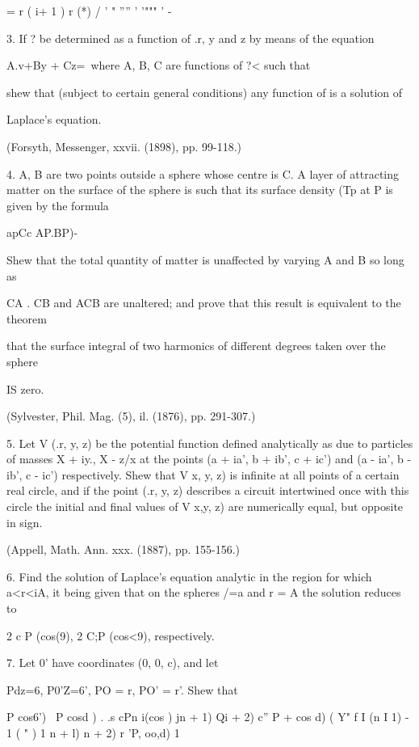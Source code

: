  = r ( i+ 1 ) r (*) / ' " '''' ' '""" ' - 

3. If ? be determined as a function of .r, y and z by means of the
equation

A.v+By + Cz=\, where A, B, C are functions of ?< such that

shew that (subject to certain general conditions) any function of is a
solution of

Laplace's equation.

(Forsyth, Messenger, xxvii. (1898), pp. 99-118.)

4. A, B are two points outside a sphere whose centre is C. A layer of
attracting matter on the surface of the sphere is such that its
surface density (Tp at P is given by the formula

apCc AP.BP)-\

Shew that the total quantity of matter is unaffected by varying A and
B so long as

CA . CB and ACB are unaltered; and prove that this result is
equivalent to the theorem

that the surface integral of two harmonics of different degrees taken
over the sphere

IS zero.

(Sylvester, Phil. Mag. (5), il. (1876), pp. 291-307.)

5. Let V (.r, y, z) be the potential function defined analytically as
due to particles of masses X + iy., X - z/x at the points (a + ia', b
+ ib', c + ic') and (a - ia', b - ib', c - ic') respectively. Shew
that V x, y, z) is infinite at all points of a certain real circle,
and if the point (.r, y, z) describes a circuit intertwined once with
this circle the initial and final values of V x,y, z) are numerically
equal, but opposite in sign.

(Appell, Math. Ann. xxx. (1887), pp. 155-156.)

6. Find the solution of Laplace's equation analytic in the region for
which a<r<iA, it being given that on the spheres /=a and r = A the
solution reduces to

2 c P (cos(9), 2 C;P (cos<9), respectively.

7. Let 0' have coordinates (0, 0, c), and let

Pdz=6, P0'Z=6', PO = r, PO' = r'. Shew that

P cos6') \ P cosd ) . .s cPn i(cos ) jn + 1) Qi + 2) c'' P + cos d) (
Y" f I (n I 1) - 1 ( " ) 1 n + l) n + 2) r 'P, oo,d) 1

